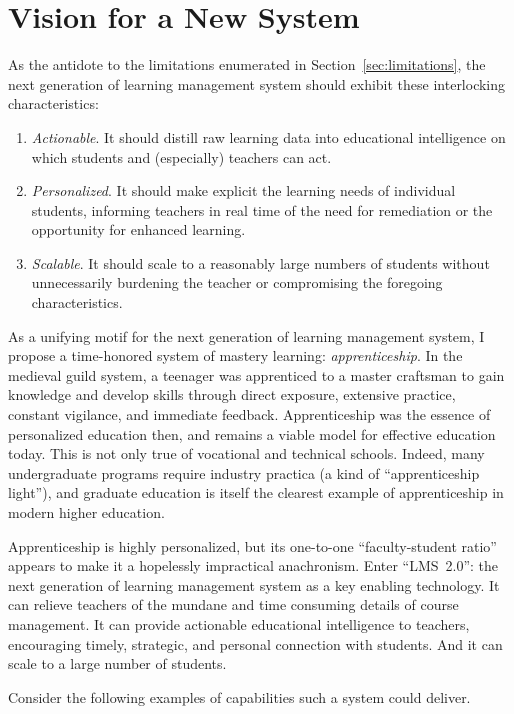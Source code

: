 \documentclass{article}
\begin{document}
\section{Vision for a New System}
\label{sec:vision}

As the antidote to the
limitations enumerated in Section~\ref{sec:limitations},
the next generation of learning management system
should exhibit these interlocking characteristics:
\begin{enumerate}
\item \emph{Actionable}.
  It should distill raw learning data
  into educational intelligence
  on which students and (especially) teachers can act.
\item \emph{Personalized}.
  It should make explicit
  the learning needs of individual students,
  informing teachers in real time
  of the need for remediation
  or the opportunity for enhanced learning.
\item \emph{Scalable}.
  It should scale
  to a reasonably large numbers of students
  without unnecessarily burdening the teacher
  or compromising the foregoing characteristics.
\end{enumerate}

As a unifying motif
for the next generation of learning management system,
I propose a time-honored system of mastery learning: \emph{apprenticeship}.
In the medieval guild system,
a teenager was apprenticed to a master craftsman
to gain knowledge and develop skills
through direct exposure, extensive practice,
constant vigilance, and immediate feedback.
Apprenticeship was the essence of personalized education then,
and remains a viable model for effective education today.
This is not only true of vocational and technical schools.
Indeed, many undergraduate programs
require industry practica (a kind of ``apprenticeship light''),
and graduate education is itself
the clearest example of apprenticeship
in modern higher education.

Apprenticeship is highly personalized,
but its one-to-one ``faculty-student ratio''
appears to make it a hopelessly impractical anachronism.
Enter ``LMS~2.0'':
the next generation of learning management system
as a key enabling technology.
It can relieve teachers
of the mundane and time consuming details of course management.
It can provide actionable educational intelligence to teachers,
encouraging timely, strategic, and personal connection with students.
And it can scale to a large number of students.

Consider the following examples of capabilities such a system could deliver.
\end{document}
